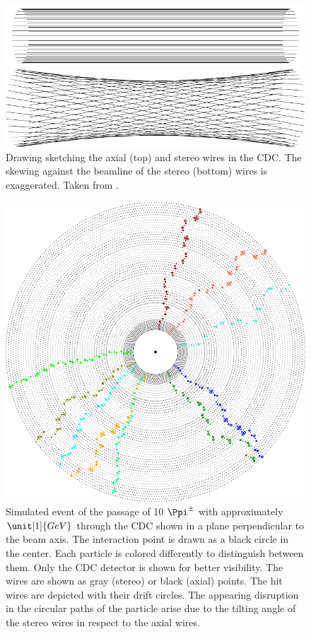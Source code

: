 \begin{figure}
  \centering
  \includegraphics{figures/experimental_setup/axialLayers.pdf}
  
  \vspace*{1.5cm}
  
  \includegraphics{figures/experimental_setup/stereoLayers.pdf}
  \caption{Drawing sketching the axial (top) and stereo wires in the CDC. The skewing against the beamline of the stereo (bottom) wires is exaggerated. Taken from \cite{oliver}.}
  \label{fig-axial-stereo}
\end{figure}

\begin{figure}
  \centering
  \includegraphics[width=0.8\linewidth]{figures/experimental_setup/eventDisplayPionGun.png}
  \caption{Simulated event of the passage of 10 $\Ppi^\pm$ with approximately $\unit[1]{GeV}$ through the CDC shown in a plane perpendicular to the beam axis. The interaction point is drawn as a black circle in the center. Each particle is colored differently to distinguish between them. Only the CDC detector is shown for better visibility. The wires are shown as gray (stereo) or black (axial) points. The hit wires are depicted with their drift circles. The appearing disruption in the circular paths of the particle arise due to the tilting angle of the stereo wires in respect to the axial wires.}
  \label{fig-event-display}
\end{figure}

